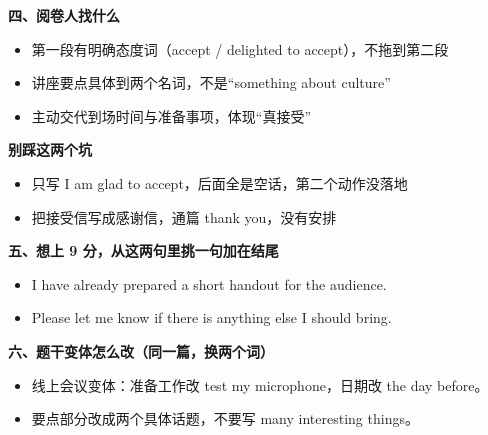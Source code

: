 \documentclass[11pt,a4paper]{ctexart}
\begin{document}
\vspace{5pt}
\noindent\begin{minipage}[t]{0.555\linewidth}
{\color{accent}\bfseries 四、阅卷人找什么}\par
{\footnotesize\begin{itemize}[leftmargin=1.2em,itemsep=1pt,topsep=1pt,parsep=0pt]\setlength{\leftmargin}{1.1em}
\item 第一段有明确态度词（accept / delighted to accept），不拖到第二段
\item 讲座要点具体到两个名词，不是“something about culture”
\item 主动交代到场时间与准备事项，体现“真接受”
\end{itemize}}
\end{minipage}\hfill
\begin{minipage}[t]{0.415\linewidth}
{\color{hot}\bfseries 别踩这两个坑}\par
{\footnotesize\begin{itemize}[leftmargin=1.2em,itemsep=1pt,topsep=1pt,parsep=0pt]\setlength{\leftmargin}{1.1em}
\item 只写 I am glad to accept，后面全是空话，第二个动作没落地
\item 把接受信写成感谢信，通篇 thank you，没有安排
\end{itemize}}
\end{minipage}\par

\vspace{6pt}
{\color{accent}\bfseries 五、想上 9 分，从这两句里挑一句加在结尾}\par
\vspace{2pt}
{\footnotesize
\begin{itemize}[leftmargin=1.2em,itemsep=1.5pt,topsep=1pt,parsep=0pt]
\item I have already prepared a short handout for the audience.
\item Please let me know if there is anything else I should bring.
\end{itemize}}\par

\vspace{6pt}
{\color{accent}\bfseries 六、题干变体怎么改（同一篇，换两个词）}\par
\vspace{2pt}
{\footnotesize
\begin{itemize}[leftmargin=1.2em,itemsep=1.5pt,topsep=1pt,parsep=0pt]
\item 线上会议变体：准备工作改 test my microphone，日期改 the day before。
\item 要点部分改成两个具体话题，不要写 many interesting things。
\end{itemize}}\par
\end{document}
